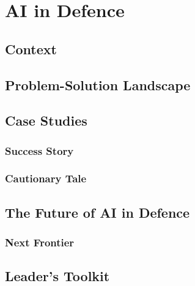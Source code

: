 \chapter{AI in Defence}
\label{chap:ai_in_defence}

\section{Context}
\label{sec:defence_context}

\section{Problem-Solution Landscape}
\label{sec:defence_problem_solution}

\section{Case Studies}
\label{sec:defence_case_studies}
\subsection{Success Story}
\label{sec:defence_success_story}
\subsection{Cautionary Tale}
\label{sec:defence_cautionary_tale}

\section{The Future of AI in Defence}
\label{sec:future_of_ai_in_defence}
\subsection{Next Frontier}
\label{sec:defence_next_frontier}

\section{Leader's Toolkit}
\label{sec:defence_leaders_toolkit}